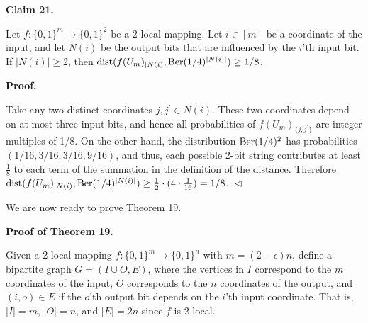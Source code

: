 \documentclass[10pt,a4paper]{article}
\begin{document}
\par\medskip\noindent\textbf{
Claim 21. 
}\par



Let $f\colon\{0,1\}^{m}\to\{0,1\}^{2}$ be a 2-local mapping. Let $i\in[m]$ be a coordinate of the input, and let $N(i)$ be the output bits that are influenced by the $i$’th input bit.
If $\lvert N(i)\rvert\geq 2$, then $\mathrm{dist}(f(U_{m})_{|N(i)},\textnormal{Ber}(1/4)^{\lvert N(i)\rvert})\geq 1/8$.\par







\par\medskip\noindent\textbf{
\textbf{Proof}.}\par




Take any two distinct coordinates $j,j^{\prime}\in N(i)$. These two coordinates depend on at most three input bits, and hence all probabilities of $f(U_{m})_{\{j,j^{\prime}\}}$ are integer multiples of 1/8.
On the other hand, the distribution $\textnormal{Ber}(1/4)^{2}$ has probabilities $(1/16,3/16,3/16,9/16)$, and thus, each possible 2-bit string contributes at least $\frac{1}{8}$ to each term of the summation in the definition of the distance. Therefore
$\mathrm{dist}(f(U_{m})_{|N(i)},\textnormal{Ber}(1/4)^{\lvert N(i)\rvert})\geq\frac{1}{2}\cdot(4\cdot\frac{1}{16})=1/8$.
$\vartriangleleft$\par




We are now ready to prove Theorem 19.\par





\par\medskip\noindent\textbf{Proof of Theorem 19.}\par




Given a 2-local mapping $f\colon\{0,1\}^{m}\to\{0,1\}^{n}$ with $m=(2-\epsilon)n$, define a bipartite graph $G=(I\cup O,E)$, where the vertices in $I$ correspond to the $m$ coordinates of the input, $O$ corresponds to the $n$ coordinates of the output, and $(i,o)\in E$ if the $o$’th output bit depends on the $i$’th input coordinate. That is, $\lvert I\rvert=m$, $\lvert O\rvert=n$, and $\lvert E\rvert=2n$ since $f$ is 2-local.\par
\end{document}
